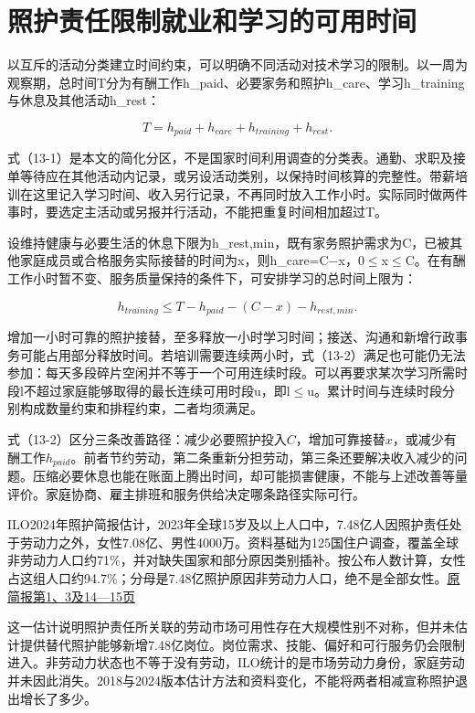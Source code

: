 \documentclass[UTF8,fontset=windows,12pt,a4paper,oneside,openany]{ctexbook}
\begin{document}
\section{照护责任限制就业和学习的可用时间}

以互斥的活动分类建立时间约束，可以明确不同活动对技术学习的限制。以一周为观察期，总时间T分为有酬工作h\_paid、必要家务和照护h\_care、学习h\_training与休息及其他活动h\_rest：

\[
T=h_{paid}+h_{care}+h_{training}+h_{rest}.\tag{13-1}
\]

式（13-1）是本文的简化分区，不是国家时间利用调查的分类表。通勤、求职及接单等待应在其他活动内记录，或另设活动类别，以保持时间核算的完整性。带薪培训在这里记入学习时间、收入另行记录，不再同时放入工作小时。实际同时做两件事时，要选定主活动或另报并行活动，不能把重复时间相加超过T。

设维持健康与必要生活的休息下限为h\_rest,min，既有家务照护需求为C，已被其他家庭成员或合格服务实际接替的时间为x，则h\_care=C\ensuremath{-}x，0\ensuremath{\leq}x\ensuremath{\leq}C。在有酬工作小时暂不变、服务质量保持的条件下，可安排学习的总时间上限为：

\[
h_{training}\leq T-h_{paid}-(C-x)-h_{rest,min}.\tag{13-2}
\]

增加一小时可靠的照护接替，至多释放一小时学习时间；接送、沟通和新增行政事务可能占用部分释放时间。若培训需要连续两小时，式（13-2）满足也可能仍无法参加：每天多段碎片空闲并不等于一个可用连续时段。可以再要求某次学习所需时段l不超过家庭能够取得的最长连续可用时段u，即l\ensuremath{\leq}u。累计时间与连续时段分别构成数量约束和排程约束，二者均须满足。

式（13-2）区分三条改善路径：减少必要照护投入$C$，增加可靠接替$x$，或减少有酬工作$h_{paid}$。前者节约劳动，第二条重新分担劳动，第三条还要解决收入减少的问题。压缩必要休息也能在账面上腾出时间，却可能损害健康，不能与上述改善等量评价。家庭协商、雇主排班和服务供给决定哪条路径实际可行。

ILO2024年照护简报估计，2023年全球15岁及以上人口中，7.48亿人因照护责任处于劳动力之外，女性7.08亿、男性4000万。资料基础为125国住户调查，覆盖全球非劳动力人口约71\%，并对缺失国家和部分原因类别插补。按公布人数计算，女性占这组人口约94.7\%；分母是7.48亿照护原因非劳动力人口，绝不是全部女性。\href{https://www.ilo.org/sites/default/files/2024-10/GEDI-STAT\%20brief_formatted_28.10.24_final.pdf}{原简报第1、3及14—15页}

这一估计说明照护责任所关联的劳动市场可用性存在大规模性别不对称，但并未估计提供替代照护能够新增7.48亿岗位。岗位需求、技能、偏好和可行服务仍会限制进入。非劳动力状态也不等于没有劳动，ILO统计的是市场劳动力身份，家庭劳动并未因此消失。2018与2024版本估计方法和资料变化，不能将两者相减宣称照护退出增长了多少。
\end{document}
